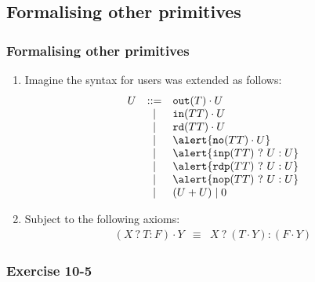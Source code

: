 \documentclass[presentation]{beamer}\mode<presentation>{\usetheme{AMSCesenaPurpleAndGold}}
\begin{document}
\subsection{Formalising other primitives}

\begin{frame}
\frametitle{Formalising other primitives}
    
    \begin{enumerate}
        \item<1-> Imagine the syntax for users was extended as follows:
        \[\begin{array}{rcl}
            U &::=& \mathtt{out}(T) \cdot U \\
            &\mid& \mathtt{in}(TT) \cdot U \\
            &\mid& \mathtt{rd}(TT) \cdot U \\
            &\mid& \alert{\mathtt{no}(TT) \cdot U} \\
            &\mid& \alert{\mathtt{inp}(TT)\ ?\ U : U} \\
            &\mid& \alert{\mathtt{rdp}(TT)\ ?\ U : U} \\
            &\mid& \alert{\mathtt{nop}(TT)\ ?\ U : U} \\
            &\mid& (U + U) \mid 0
        \end{array}\]
        
        \item Subject to the following axioms:
        \[\begin{array}{rcl}
            (X\ ?\ T : F) \cdot Y &\equiv& X\ ?\ (T \cdot Y) : (F \cdot Y)
        \end{array}\]
        
    \end{enumerate}
    
\end{frame}

\subsubsection{Exercise 10-5}
\end{document}
